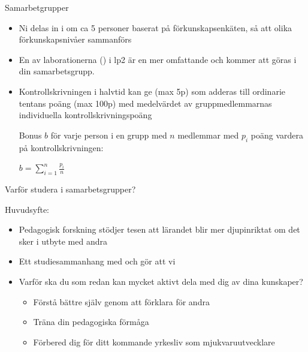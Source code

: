 \begin{SlideExtra}{Samarbetgrupper}\footnotesize
\begin{itemize}
\item Ni delas in i  om ca 5 personer baserat på förkunskapsenkäten, så att olika förkunskapsnivåer sammanförs
\item En av laborationerna () i lp2 är en mer omfattande  och kommer att göras i din samarbetsgrupp. \\ \vspace{1em}
\item Kontrollskrivningen i halvtid kan ge  (max 5p) som adderas till ordinarie tentans poäng (max 100p) med medelvärdet av gruppmedlemmarnas individuella kontrollskrivningspoäng
\scriptsize \parbox{7cm}{Bonus $b$ för varje person i en grupp med $n$ medlemmar med $p_i$ poäng vardera på kontrollskrivningen:}
 \hspace{5mm} $\displaystyle b = \sum\limits_{i=1}^n \frac{p_i}{n}$
\end{itemize}
\end{SlideExtra}



\begin{SlideExtra}{Varför studera i samarbetsgrupper?}

Huvudsyfte: 

\begin{itemize}
\item Pedagogisk forskning stödjer tesen att lärandet blir mer djupinriktat om det sker i utbyte med andra
\item Ett studiesammanhang med  och  gör att vi 
\item Varför ska du som redan kan mycket aktivt dela med dig av dina kunskaper?
\begin{itemize}
\item Förstå bättre själv genom att förklara för andra
\item Träna din pedagogiska förmåga
\item Förbered dig för ditt kommande yrkesliv som mjukvaruutvecklare
\end{itemize}
\end{itemize}
\end{SlideExtra}



